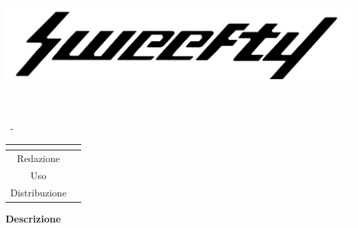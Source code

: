 \documentclass[a4paper, oneside, openany]{article}
\begin{document}
\begin{titlepage}
	\begin{center}
		
		\begin{center}
			\centerline{\includegraphics[scale=0.24]{../../../CommonImages/logo.jpg}}
		\end{center}
		
		\vspace{1cm}
		
		\begin{Huge}
			\textbf{\Titolo{}} \\
		\end{Huge}
		
		\vspace{9pt}  
		
		\begin{large}
			\Gruppo{}\ - \Data{}
		\end{large}	  
		
		\vspace{15pt}
		
		\bgroup
		\def\arraystretch{1.3}
		\centering
		\begin{tabular}{c|L{5cm}}
			 \\ \hline
			Redazione & \ACapoRedazione{} \ & \Uso \\
			Distribuzione & \Distribuzione{}
		\end{tabular}
		\egroup
		
		\vspace{15pt}
		
		\begin{center}
			\textbf{Descrizione\\}
			\DescrizioneDoc{}
		\end{center}
		
	\end{center}
\end{titlepage}

\restoregeometry
	
\end{document}
